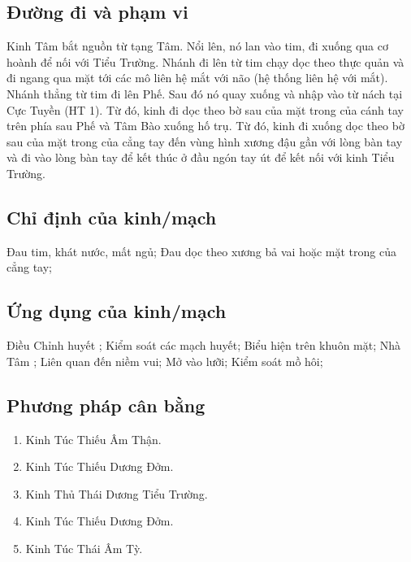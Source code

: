 \documentclass[12pt,a4paper]{article}
\begin{document}
\subsection*{Đường đi và phạm vi}Kinh Tâm bắt nguồn từ tạng Tâm. Nổi lên, nó lan vào tim, đi xuống qua cơ hoành để nối với Tiểu Trường. Nhánh đi lên từ tim chạy dọc theo thực quản và đi ngang qua mặt tới các mô liên hệ mắt với não (hệ thống liên hệ với mắt). Nhánh thẳng từ tim đi lên Phế. Sau đó nó quay xuống và nhập vào từ nách tại Cực Tuyền (HT 1). Từ đó, kinh đi dọc theo bờ sau của mặt trong của cánh tay trên phía sau Phế và Tâm Bào xuống hố trụ. Từ đó, kinh đi xuống dọc theo bờ sau của mặt trong của cẳng tay đến vùng hình xương đậu gần với lòng bàn tay và đi vào lòng bàn tay để kết thúc ở đầu ngón tay út để kết nối với kinh Tiểu Trường.
\subsection*{Chỉ định của kinh/mạch}Đau tim, khát nước, mất ngủ; Đau dọc theo xương bả vai hoặc mặt trong của cẳng tay;
\subsection*{Ứng dụng của kinh/mạch}Điều Chỉnh huyết ; Kiểm soát các mạch huyết; Biểu hiện trên khuôn mặt; Nhà Tâm ; Liên quan đến niềm vui; Mở vào lưỡi; Kiểm soát mồ hôi;
\subsection*{Phương pháp cân bằng}
\begin{enumerate}
\item Kinh Túc Thiếu Âm Thận.
\item Kinh Túc Thiếu Dương Đởm.
\item Kinh Thủ Thái Dương Tiểu Trường.
\item Kinh Túc Thiếu Dương Đởm.
\item Kinh Túc Thái Âm Tỳ.
\end{enumerate}
\end{document}
